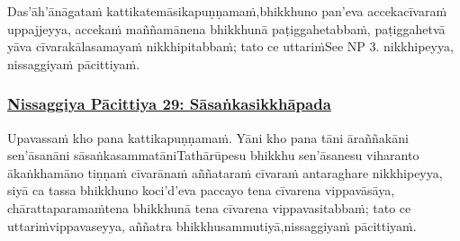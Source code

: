 {
Das'āh'ānāgataṁ kattikatemāsikapuṇṇamaṁ,\makeatletter\hyperlink{endnote215-appendix}\makeatother \thinspace bhikkhuno pan'eva accekacīvaraṁ uppajjeyya, accekaṁ maññamānena bhikkhunā paṭiggahetabbaṁ, paṭiggahetvā yāva cīvarakālasamayaṁ nikkhipitabbaṁ; tato ce uttariṁ\makeatletter\hyperlink{endnote216-appendix}\makeatother \thinspace See NP 3. nikkhipeyya, nissaggiyaṁ pācittiyaṁ.



\subsubsection*{\hyperref[forf-exp29]{Nissaggiya Pācittiya 29: Sāsaṅkasikkhāpada}}
\label{np29}

Upavassaṁ kho pana kattikapuṇṇamaṁ. Yāni kho pana tāni āraññakāni sen'āsanāni sāsaṅkasammatāni\makeatletter\hyperlink{endnote217-appendix}\makeatother \thinspace Tathārūpesu bhikkhu sen'āsanesu viharanto ākaṅkhamāno tiṇṇaṁ cīvarānaṁ aññataraṁ cīvaraṁ antaraghare nikkhipeyya, siyā ca tassa bhikkhuno koci'd'eva paccayo tena cīvarena vippavāsāya, chārattaparamaṁ\makeatletter\hyperlink{endnote218-appendix}\makeatother \thinspace tena bhikkhunā tena cīvarena vippavasitabbaṁ; tato ce uttariṁ\makeatletter\hyperlink{endnote219-appendix}\makeatother \thinspace vippavaseyya, aññatra bhikkhusammutiyā,\makeatletter\hyperlink{endnote220-appendix}\makeatother \thinspace nissaggiyaṁ pācittiyaṁ.



}
